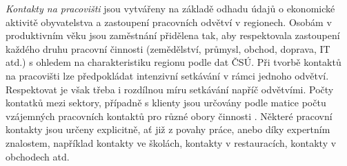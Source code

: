 
\emph{Kontakty na pracovišti} jsou vytvářeny na základě odhadu údajů o ekonomické aktivitě obyvatelstva a zastoupení pracovních odvětví v regionech. Osobám v produktivním věku jsou zaměstnání přidělena tak, aby respektovala zastoupení každého druhu pracovní činnosti (zemědělství, průmysl, obchod, doprava, IT atd.) s ohledem na charakteristiku regionu podle dat ČSÚ. Při tvorbě kontaktů na pracovišti lze předpokládat intenzivní setkávání v rámci jednoho odvětví. Respektovat je však třeba i rozdílnou míru setkávání napříč odvětvími. Počty kontatků mezi sektory, případně s klienty jsou určovány podle matice počtu vzájemných pracovních kontaktů pro různé obory činnosti \cite{Prem_etal2017}. Některé pracovní kontakty jsou určeny explicitně, ať již z povahy práce, anebo díky expertním znalostem, například kontakty ve školách, kontakty v restauracích, kontakty v obchodech atd.






